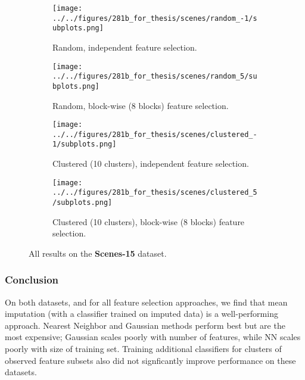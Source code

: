 \begin{figure}[ht]
    \centering
    \begin{subfigure}[b]{.8\textwidth}
        \centering
        \texttt{[image: ../../figures/281b\_for\_thesis/scenes/random\_-1/subplots.png]}
        \caption{Random, independent feature selection.\vspace{.2cm}}
    \end{subfigure}
    \begin{subfigure}[b]{.8\textwidth}
        \centering
        \texttt{[image: ../../figures/281b\_for\_thesis/scenes/random\_5/subplots.png]}
        \caption{Random, block-wise (8 blocks) feature selection.\vspace{.2cm}}
    \end{subfigure}
    \begin{subfigure}[b]{\textwidth}
        \centering
        \texttt{[image: ../../figures/281b\_for\_thesis/scenes/clustered\_-1/subplots.png]}
        \caption{Clustered (10 clusters), independent feature selection.\vspace{.2cm}}
    \end{subfigure}
    \begin{subfigure}[b]{\textwidth}
        \centering
        \texttt{[image: ../../figures/281b\_for\_thesis/scenes/clustered\_5/subplots.png]}
        \caption{Clustered (10 clusters), block-wise (8 blocks) feature selection.\vspace{.2cm}}
    \end{subfigure}
    \caption{All results on the \textbf{Scenes-15} dataset.}
    \label{fig:scenes}
\end{figure}

\subsubsection{Conclusion}

On both datasets, and for all feature selection approaches, we find that mean imputation (with a classifier trained on imputed data) is a well-performing approach.
Nearest Neighbor and Gaussian methods perform best but are the most expensive; Gaussian scales poorly with number of features, while NN scales poorly with size of training set.
Training additional classifiers for clusters of observed feature subsets also did not signficantly improve performance on these datasets.
